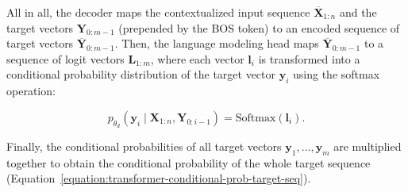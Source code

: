 All in all, the decoder maps the contextualized input sequence $\overline{\bm{X}}_{1:n}$ and the target vectors $\bm{Y}_{0:m-1}$ (prepended by the \ac{BOS} token) to an encoded sequence of target vectors $\overline{\bm{Y}}_{0:m-1}$. Then, the language modeling head maps $\overline{\bm{Y}}_{0:m-1}$ to a sequence of logit vectors $\bm{L}_{1:m}$, where each vector $\bm{l}_i$ is transformed into a conditional probability distribution of the target vector $\bm{y}_i$ using the softmax operation:

\begin{equation}
    p_{\theta_d}(\bm{y}_i \mid \bm{X}_{1:n}, \bm{Y}_{0:i-1}) = \mathrm{Softmax}(\bm{l}_i).
\end{equation}

Finally, the conditional probabilities of all target vectors $\bm{y}_1, \ldots, \bm{y}_m$ are multiplied together to obtain the conditional probability of the whole target sequence (Equation~\ref{equation:transformer-conditional-prob-target-seq}).

